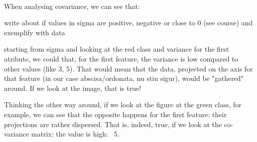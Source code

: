\paragraph{}
When analysing covariance, we can see that: 

write about if values in sigma are positive, negative or close to 0 (see course) and exemplify with data

starting from sigma and looking at the red class and variance for the first atribute, we could that, for the first feature, the variance is low compared to other values (like 3, 5).
That would mean that the data, projected on the axis for that feature (in our case abscisa/ordonata, nu stiu sigur), would be "gathered" around.
If we look at the image, that is true!

Thinking the other way around, if we look at the figure at the green class, for example, we can see that the opposite happens for the first feature: their projections are rather dispersed.
That is, indeed, true, if we look at the co-variance matrix: the value is high: ~5.